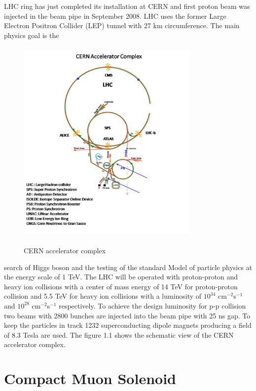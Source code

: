 LHC ring has just completed its installation at CERN and first
proton beam was injected in the beam pipe in September 2008.
LHC uses the former Large Electron Positron Collider (LEP)
tunnel with 27 km circumference. The main physics goal is the
    \begin{figure}[h]
    \begin{center}
    \includegraphics[width=3.5in, height= 4.0in]{pic/complex} \\
    \caption{CERN accelerator complex}
    \end{center}
    \end{figure}
search of Higgs boson and the testing of the standard Model of
particle physics at the energy scale of 1 TeV. The LHC will be
operated with proton-proton and heavy ion collisions with a
center of mass energy of 14 TeV for proton-proton collision and
5.5 TeV for heavy ion collisions with a luminosity of $10^{34}$
cm$^{-2}$s$^{-1}$ and $10^{28}$ cm$^{-2}$s$^{-1}$ respectively.
To achieve the design luminosity for p-p collision two beams
with 2800 bunches are injected into the beam pipe with 25 ns
gap. To keep the particles in track 1232 superconducting dipole
magnets producing a field of 8.3 Tesla are used. The figure 1.1
shows the schematic view of the CERN accelerator complex.

\bigskip
\section{Compact Muon Solenoid}


